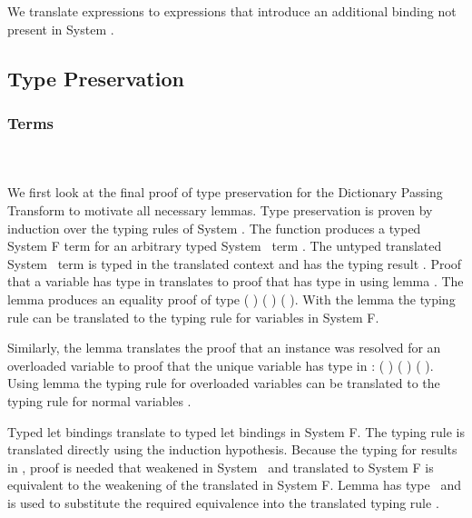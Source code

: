 \noindent We translate  expressions to  expressions that introduce an additional binding not present in System \Fo.

\subsection{Type Preservation}
\subsubsection{Terms}\hfill\\\\
We first look at the final proof of type preservation for the Dictionary Passing Transform to motivate all necessary lemmas. 
Type preservation is proven by induction over the typing rules of System \Fo. 
The function  produces a typed System F term for an arbitrary typed System \Fo\ term . 
The untyped translated System \Fo\ term   is typed in the translated context   and has the typing result  .
\DPTTermPres
Proof  that a variable  has type  in  translates to proof that   has type   in   using lemma . 
The lemma produces an equality proof of type  ( ) ( )  ( ).
With the lemma  the typing rule  can be translated to the typing rule for variables in System F. 

\noindent Similarly, the lemma  translates the proof that an instance  \Constr{:}  was resolved for an overloaded variable  to proof that the unique variable   has type   in  :  ( ) ( )  ( ).  
Using lemma  the typing rule for overloaded variables  can be translated to the typing rule for normal variables .

\noindent Typed let bindings    translate to typed let bindings in System F. 
The typing rule  is translated directly using the induction hypothesis. 
Because the typing for  results in  , proof is needed that  weakened in System \Fo\ and translated to System F is equivalent to the weakening of the translated  in System F. 
Lemma  has type \DPTTypePresWk\ and is used to substitute the required equivalence into the translated typing rule  .

